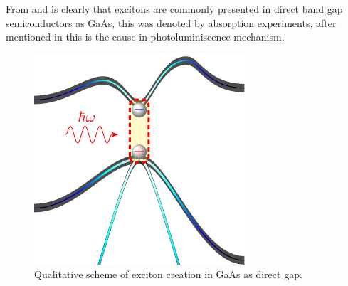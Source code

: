 From  and   is clearly that excitons are commonly presented in direct band gap semiconductors as GaAs, this was denoted by absorption experiments,  after mentioned in  this is the cause in photoluminiscence mechanism.

\begin{figure}[b]
	\centering
	\includegraphics[width=0.5\linewidth]{../figures/chapter-1/exciton-1/build/x-1}
	\caption{Qualitative scheme of exciton creation in GaAs as direct gap.}
	\label{fig:subsubsection-1.1.1-x-1}
\end{figure}

